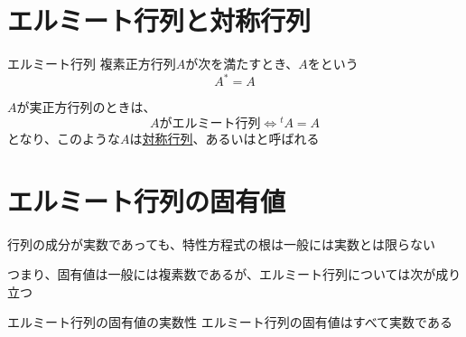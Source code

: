 \documentclass[../../../topic_linear-algebra]{subfiles}
\begin{document}
\sectionline
\section{エルミート行列と対称行列}

\begin{definition}{エルミート行列}
  複素正方行列$A$が次を満たすとき、$A$をという
  \begin{equation*}
    A^* = A
  \end{equation*}
\end{definition}

$A$が実正方行列のときは、
\begin{equation*}
  A\text{がエルミート行列} \Longleftrightarrow {}^tA = A
\end{equation*}
となり、このような$A$は\hyperref[def:symmetric-matrix]{対称行列}、あるいはと呼ばれる

\sectionline
\section{エルミート行列の固有値}

行列の成分が実数であっても、特性方程式の根は一般には実数とは限らない

つまり、固有値は一般には複素数であるが、エルミート行列については次が成り立つ

\begin{theorem}{エルミート行列の固有値の実数性}
  エルミート行列の固有値はすべて実数である
\end{theorem}
\end{document}
